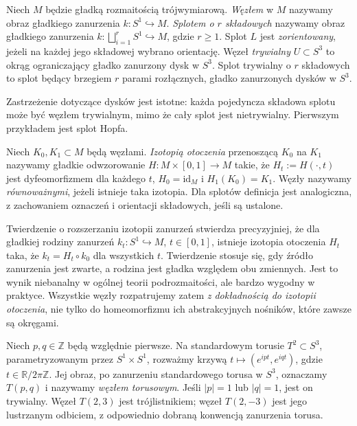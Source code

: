 \begin{definicja}
Niech $M$ będzie gładką rozmaitością trójwymiarową.
\emph{Węzłem} w $M$ nazywamy obraz gładkiego zanurzenia
$k\colon S^1\hookrightarrow M$.
\emph{Splotem o $r$ składowych} nazywamy obraz gładkiego zanurzenia
$k\colon\bigsqcup_{i=1}^{r}S^1\hookrightarrow M$, gdzie $r\geq1$.
Splot $L$ jest \emph{zorientowany}, jeżeli na każdej jego składowej
wybrano orientację. Węzeł \emph{trywialny} $U\subset S^3$ to okrąg
ograniczający gładko zanurzony dysk w $S^3$. Splot trywialny o $r$
składowych to splot będący brzegiem $r$ parami rozłącznych,
gładko zanurzonych dysków w $S^3$.
\end{definicja}

Zastrzeżenie dotyczące dysków jest istotne: każda pojedyncza składowa
splotu może być węzłem trywialnym, mimo że cały splot jest
nietrywialny. Pierwszym przykładem jest splot Hopfa.

\begin{definicja}
Niech $K_0,K_1\subset M$ będą węzłami. \emph{Izotopią otoczenia}
przenoszącą $K_0$ na $K_1$ nazywamy gładkie odwzorowanie
$H\colon M\times[0,1]\to M$ takie, że $H_t:=H(\cdot,t)$
jest dyfeomorfizmem dla każdego $t$, $H_0=\mathrm{id}_M$ i
$H_1(K_0)=K_1$. Węzły nazywamy \emph{równoważnymi}, jeżeli
istnieje taka izotopia. Dla splotów definicja jest analogiczna,
z zachowaniem oznaczeń i orientacji składowych, jeśli są ustalone.
\end{definicja}

Twierdzenie o rozszerzaniu izotopii zanurzeń stwierdza precyzyjniej,
że dla gładkiej rodziny zanurzeń $k_t\colon S^1\hookrightarrow M$,
$t\in[0,1]$, istnieje izotopia otoczenia $H_t$ taka, że
$k_t=H_t\circ k_0$ dla wszystkich $t$. Twierdzenie stosuje się,
gdy źródło zanurzenia jest zwarte, a rodzina jest gładka względem
obu zmiennych. Jest to wynik niebanalny w ogólnej teorii podrozmaitości,
ale bardzo wygodny w praktyce. Wszystkie węzły rozpatrujemy zatem
\emph{z dokładnością do izotopii otoczenia}, nie tylko do homeomorfizmu
ich abstrakcyjnych nośników, które zawsze są okręgami.

\begin{przyklad}
Niech $p,q\in\mathbb Z$ będą względnie pierwsze. Na standardowym
torusie $T^2\subset S^3$, parametryzowanym przez
$S^1\times S^1$, rozważmy krzywą
$t\mapsto(e^{ipt},e^{iqt})$, gdzie $t\in\mathbb R/2\pi\mathbb Z$.
Jej obraz, po zanurzeniu standardowego torusa w $S^3$, oznaczamy
$T(p,q)$ i nazywamy \emph{węzłem torusowym}. Jeśli $|p|=1$
lub $|q|=1$, jest on trywialny. Węzeł $T(2,3)$ jest trójlistnikiem;
węzeł $T(2,-3)$ jest jego lustrzanym odbiciem, z odpowiednio
dobraną konwencją zanurzenia torusa.
\end{przyklad}

